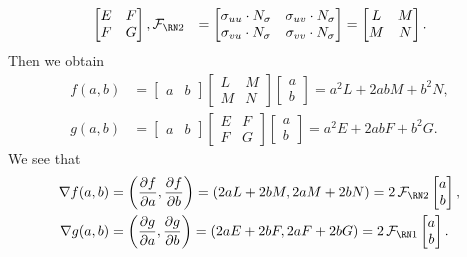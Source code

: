 \begin{pf}
\begin{align*}
\begin{bmatrix}
            E & F \\ F & G 
        \end{bmatrix}, & \SFF &= \begin{bmatrix} 
            \sigma_{uu} \cdot N_\sigma & \sigma_{uv} \cdot N_\sigma \\ 
            \sigma_{vu} \cdot N_\sigma & \sigma_{vv} \cdot N_\sigma 
        \end{bmatrix} = \begin{bmatrix}
            L & M \\ M & N
        \end{bmatrix}.
    \end{align*}
    Then we obtain 
    \begin{align*}
        f(a, b) &= \begin{bmatrix}
            a & b 
        \end{bmatrix} \begin{bmatrix}
            L & M \\ M & N
        \end{bmatrix} \begin{bmatrix}
            a \\ b 
        \end{bmatrix} = a^2 L + 2ab M + b^2 N, \\ 
        g(a, b) &= \begin{bmatrix}
            a & b 
        \end{bmatrix} \begin{bmatrix}
            E & F \\ F & G
        \end{bmatrix} \begin{bmatrix}
            a \\ b 
        \end{bmatrix} = a^2 E + 2ab F + b^2 G.
    \end{align*}
    We see that 
    \begin{align*}
        \nabla f(a, b) &= \left( \frac{\partial f}{\partial a}, 
        \frac{\partial f}{\partial b} \right) = (2aL + 2bM, 2aM + 2bN) 
        = 2\SFF \begin{bmatrix} a \\ b \end{bmatrix}, \\ 
        \nabla g(a, b) &= \left( \frac{\partial g}{\partial a}, 
        \frac{\partial g}{\partial b} \right) = (2aE + 2bF, 2aF + 2bG) 
        = 2\FFF \begin{bmatrix} a \\ b \end{bmatrix}.

\end{align*}
\end{pf}
